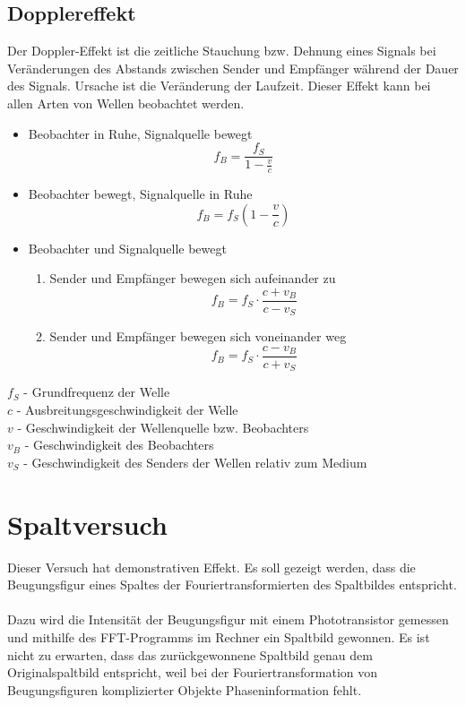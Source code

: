\documentclass[a4paper,titlepage]{scrartcl}
\numberwithin{equation}{section}
\begin{document}
\subsection{Dopplereffekt}
Der Doppler-Effekt ist die zeitliche Stauchung bzw. Dehnung eines Signals bei Veränderungen des Abstands zwischen Sender und Empfänger während der Dauer des Signals. Ursache ist die Veränderung der Laufzeit. Dieser Effekt kann bei allen Arten von Wellen beobachtet werden.
\begin{itemize}
\item Beobachter in Ruhe, Signalquelle bewegt\\ \begin{equation*}
f_B=\frac{f_S}{1 - \frac{v}{c}}
\end{equation*}
\item Beobachter bewegt, Signalquelle in Ruhe\\ \begin{equation*}
f_B=f_S \left(1 - \frac{v}{c}\right)
\end{equation*}
\item Beobachter und Signalquelle bewegt\\ \begin{enumerate}
\item Sender und Empfänger bewegen sich aufeinander zu \begin{equation*}
f_B=f_S \cdot \frac{c + v_B}{c - v_S}
\end{equation*}
\item Sender und Empfänger bewegen sich voneinander weg
\begin{equation*}
f_B=f_S \cdot \frac{c - v_B}{c + v_S}
\end{equation*}
\end{enumerate}
\end{itemize}
$f_S$ - Grundfrequenz der Welle\\
$c$ - Ausbreitungsgeschwindigkeit der Welle\\
$v$ - Geschwindigkeit der Wellenquelle bzw. Beobachters\\
$v_B$ - Geschwindigkeit des Beobachters \\
$v_S$ - Geschwindigkeit des Senders der Wellen relativ zum Medium
\newpage
\section{Spaltversuch}
Dieser Versuch hat demonstrativen Effekt. Es soll gezeigt werden, dass die Beugungsfigur eines Spaltes der Fouriertransformierten des Spaltbildes entspricht.\\ \\
Dazu wird die Intensität der Beugungsfigur mit einem Phototransistor gemessen und mithilfe des FFT-Programms im Rechner ein Spaltbild gewonnen. Es ist nicht zu erwarten, dass das zurückgewonnene Spaltbild genau dem Originalspaltbild entspricht, weil bei der Fouriertransformation von Beugungsfiguren komplizierter Objekte Phaseninformation fehlt.
\end{document}
